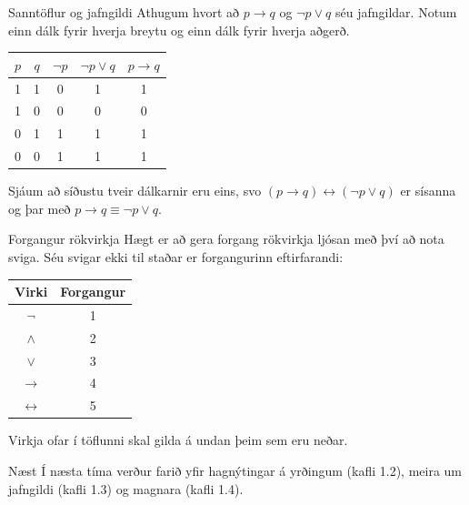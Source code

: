 \documentclass[handout]{beamer}
\begin{document}
\begin{frame}{Sanntöflur og jafngildi}
Athugum hvort að $p \to q$ og $\lnot p \lor q$ séu jafngildar. Notum einn dálk fyrir hverja breytu og einn dálk fyrir hverja aðgerð. \pause
\begin{center}
\begin{tabular}{ccccc}
\toprule
$p$&$q$&$\lnot p$&$\lnot p \lor q$&$p \to q$ \\
\midrule
1&1&0&1&1\\
1&0&0&0&0\\
0&1&1&1&1\\
0&0&1&1&1\\
\bottomrule
\end{tabular}
\end{center}
Sjáum að síðustu tveir dálkarnir eru eins, svo $(p \to q) \leftrightarrow (\lnot p \lor q)$ er sísanna og þar með $p \to q \equiv \lnot p \lor q$.
\end{frame}

\begin{frame}{Forgangur rökvirkja}
Hægt er að gera forgang rökvirkja ljósan með því að nota sviga. Séu svigar ekki til staðar er forgangurinn eftirfarandi:

\begin{center}
\begin{tabular}{cc}
\toprule
Virki&Forgangur\\
\midrule
$\lnot$&1\\
$\land$&2\\
$\lor$&3\\
$\to$&4\\
$\leftrightarrow$&5\\
\bottomrule
\end{tabular}
\end{center}

Virkja ofar í töflunni skal gilda á undan þeim sem eru neðar.
\end{frame}

\begin{frame}{Næst}
Í næsta tíma verður farið yfir hagnýtingar á yrðingum (kafli 1.2), meira um jafngildi (kafli 1.3) og magnara (kafli 1.4).
\end{frame}
\end{document}
